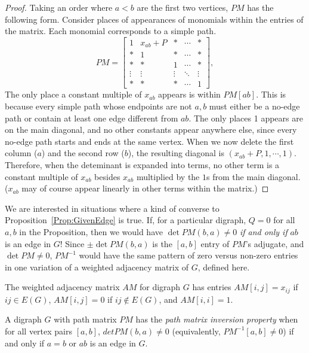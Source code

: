 \documentclass[12pt]{article}
\begin{document}
\begin{proof}
  Taking an order where $a<b$ are the first two vertices, $PM$ has the following
  form.  Consider places of appearances of monomials within the entries of the matrix.
  Each monomial corresponds to a simple path.
  \[
  PM=\left[
    \begin{matrix}
      1      & x_{ab}+P & *      & \cdots & *  \\
      *      & 1       &  *     & \cdots & *  \\
      *      & *       &  1     & \cdots & *  \\
      \vdots & \vdots  & \vdots & \ddots & \vdots \\
      *      & *       & *      & \cdots &  1
    \end{matrix}
  \right],
  \]
  The only place a constant multiple of $x_{ab}$ appears is within $PM[ab]$. This is because
  every simple path whose endpoints are not $a,b$ must either be a no-edge path or
  contain at least one edge different from $ab$.  The only places
  1 appears are on the main diagonal, and no other constants appear anywhere else, since every
  no-edge path starts and ends at the same vertex. 
  When we now delete the first column ($a$) and the second row ($b$), the resulting diagonal
  is $(x_{ab} +P, 1, \cdots, 1)$.
  Therefore, when the deteminant is expanded into terms, no other term is a
  constant multiple of $x_{ab}$ besides $x_{ab}$ multiplied by the $1$s from the main diagonal.
  ($x_{ab}$ may of course appear linearly in other terms within the matrix.)
  \end{proof}


We are interested in situations where a kind of converse to Proposition~\ref{Prop:GivenEdge} is true.
If, for a particular digraph, $Q=0$ for all $a,b$ in the Proposition, then we would have
$\det PM(b,a) \neq 0$ \emph{if and only if} $ab$ is an edge in $G$!  Since $\pm\det PM(b,a)$ is the
$[a,b]$ entry of $PM$'s adjugate, and $\det PM\neq 0$, $PM^{-1}$ would have the same pattern of
zero versus non-zero entries in one variation of a weighted adjacency matrix of $G$, defined here.

\begin{definition}
  The weighted adjacency matrix $AM$ for digraph $G$ has entries $AM[i,j]=x_{ij}$ if $ij\in E(G)$,
  $AM[i,j]=0$ if $ij\not\in E(G)$, and $AM[i,i]=1$.
\end{definition}


\begin{definition}
  A digraph $G$ with path matrix $PM$  has the
  \emph{path matrix inversion property} when for all vertex pairs $[a,b]$,
  $det PM(b,a)\neq 0$ (equivalently, $PM^{-1}[a,b]\neq 0$) if and only if
  $a=b$ or $ab$ is an edge in $G$.
\end{definition}
  
\end{document}
